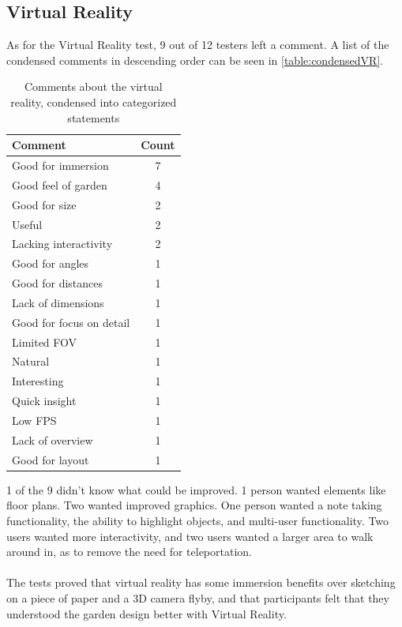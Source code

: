 \subsection*{Virtual Reality}
	As for the Virtual Reality test, 9 out of 12 testers left a comment. A list of the condensed comments in descending order can be seen in \autoref{table:condensedVR}.
	\begin{table}[H]
		\centering
		\caption{Comments about the virtual reality, condensed into categorized statements}
		\label{table:condensedVR}
		\begin{tabular}{p{5cm}|c}
			Comment & Count \\ \hline
			Good for immersion & 7 \\
			Good feel of garden & 4 \\
			Good for size  & 2 \\
			Useful & 2 \\
			Lacking interactivity & 2 \\
			Good for angles & 1 \\
			Good for distances& 1 \\
			Lack of dimensions& 1 \\
			Good for focus on detail& 1 \\
			Limited FOV& 1 \\
			Natural& 1 \\
			Interesting& 1 \\
			Quick insight& 1 \\
			Low FPS& 1 \\
			Lack of overview& 1 \\
			Good for layout& 1 \\
			
		\end{tabular}
		
	\end{table}
 1 of the 9 didn't know what could be improved. 1 person wanted elements like floor plans. Two wanted improved graphics. One person wanted a note taking functionality, the ability to highlight objects, and multi-user functionality. Two users wanted more interactivity, and two users wanted a larger area to walk around in, as to remove the need for teleportation.\\\\

The tests proved that virtual reality has some immersion benefits over sketching on a piece of paper and a 3D camera flyby, and that participants felt that they understood the garden design better with Virtual Reality.
